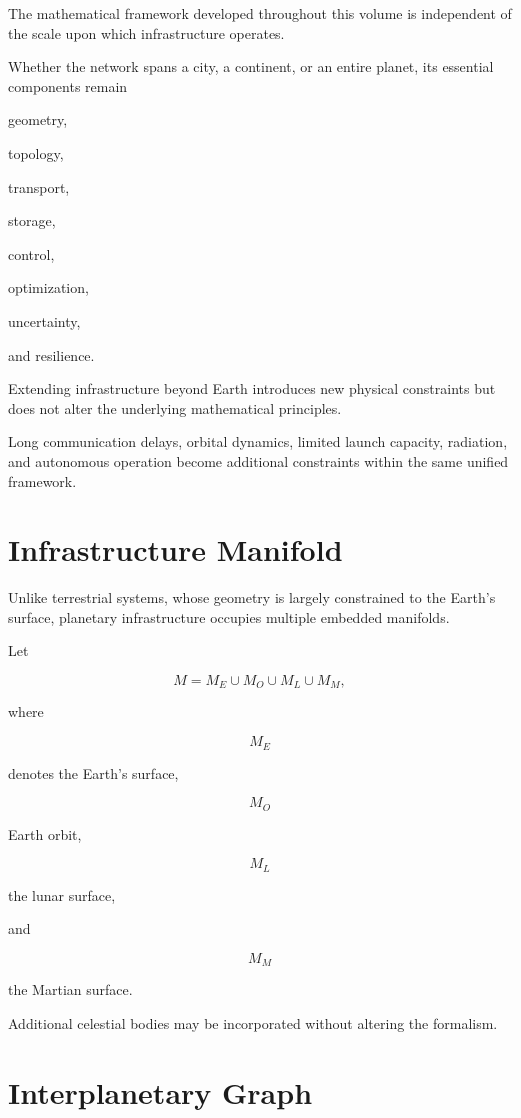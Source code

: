 \documentclass[11pt,fleqn]{book}
\numberwithin{equation}{chapter}
\theoremstyle{plain}
\theoremstyle{definition}
\theoremstyle{remark}
\begin{document}
The mathematical framework developed throughout this volume is
independent of the scale upon which infrastructure operates.

Whether the network spans a city,
a continent,
or an entire planet,
its essential components remain

geometry,

topology,

transport,

storage,

control,

optimization,

uncertainty,

and resilience.

Extending infrastructure beyond Earth introduces new physical
constraints but does not alter the underlying mathematical principles.

Long communication delays,
orbital dynamics,
limited launch capacity,
radiation,
and autonomous operation become additional constraints within the same
unified framework.


\section{Infrastructure Manifold}

Unlike terrestrial systems, whose geometry is largely constrained to the
Earth's surface, planetary infrastructure occupies multiple embedded
manifolds.

Let

\[
M
=
M_E
\cup
M_O
\cup
M_L
\cup
M_M,
\]

where

\[
M_E
\]

denotes the Earth's surface,

\[
M_O
\]

Earth orbit,

\[
M_L
\]

the lunar surface,

and

\[
M_M
\]

the Martian surface.

Additional celestial bodies may be incorporated without altering the
formalism.


\section{Interplanetary Graph}
\end{document}
